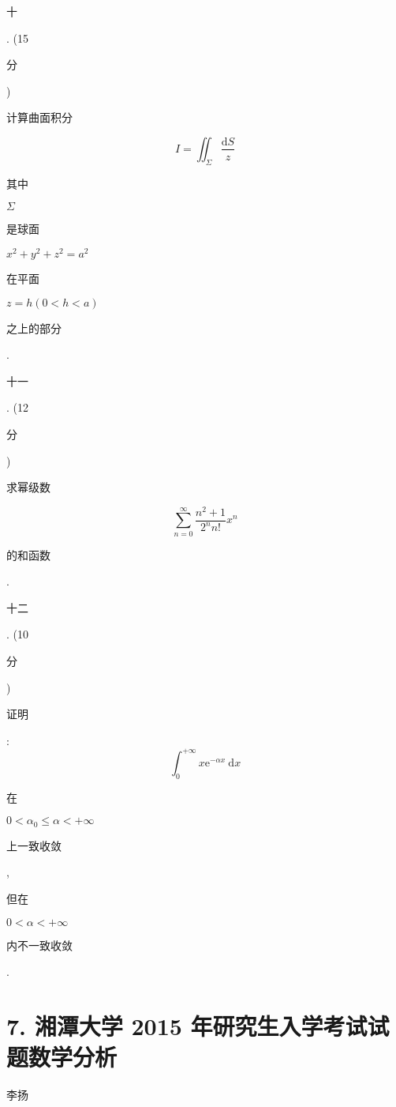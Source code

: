 \documentclass[10pt]{article}
\begin{document}
\begin{CJK}{UTF8}{mj}十\end{CJK}. (15 \begin{CJK}{UTF8}{mj}分\end{CJK}) \begin{CJK}{UTF8}{mj}计算曲面积分\end{CJK}
$$
I=\iint_{\Sigma} \frac{\mathrm{d} S}{z}
$$
\begin{CJK}{UTF8}{mj}其中\end{CJK} $\Sigma$ \begin{CJK}{UTF8}{mj}是球面\end{CJK} $x^{2}+y^{2}+z^{2}=a^{2}$ \begin{CJK}{UTF8}{mj}在平面\end{CJK} $z=h(0<h<a)$ \begin{CJK}{UTF8}{mj}之上的部分\end{CJK}. \begin{CJK}{UTF8}{mj}十一\end{CJK}. (12 \begin{CJK}{UTF8}{mj}分\end{CJK}) \begin{CJK}{UTF8}{mj}求幂级数\end{CJK}
$$
\sum_{n=0}^{\infty} \frac{n^{2}+1}{2^{n} n !} x^{n}
$$
\begin{CJK}{UTF8}{mj}的和函数\end{CJK}.

\begin{CJK}{UTF8}{mj}十二\end{CJK}. (10 \begin{CJK}{UTF8}{mj}分\end{CJK}) \begin{CJK}{UTF8}{mj}证明\end{CJK}:
$$
\int_{0}^{+\infty} x \mathrm{e}^{-\alpha x} \mathrm{~d} x
$$
\begin{CJK}{UTF8}{mj}在\end{CJK} $0<\alpha_{0} \leqslant \alpha<+\infty$ \begin{CJK}{UTF8}{mj}上一致收敛\end{CJK}, \begin{CJK}{UTF8}{mj}但在\end{CJK} $0<\alpha<+\infty$ \begin{CJK}{UTF8}{mj}内不一致收敛\end{CJK}.

\section{7. 湘潭大学 2015 年研究生入学考试试题数学分析}
\begin{CJK}{UTF8}{mj}李扬\end{CJK}
\end{document}
